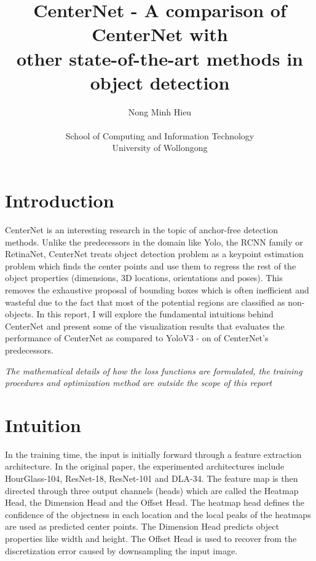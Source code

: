 \documentclass[12pt]{article}
\title{CenterNet - A comparison of CenterNet with \\
other state-of-the-art methods in object detection}
\author{Nong Minh Hieu\\ \\
 School of Computing and Information Technology\\
 University of Wollongong}
\begin{document}
\maketitle

\section*{Introduction}

CenterNet is an interesting research in the topic of anchor-free detection methods. Unlike the predecessors in the domain like Yolo, the RCNN family or RetinaNet, CenterNet treats object detection problem as a keypoint estimation problem which finds the center points and use them to regress the rest of the object properties (dimensions, 3D locations, orientations and poses). This removes the exhaustive proposal of bounding boxes which is often inefficient and wasteful due to the fact that most of the potential regions are classified as non-objects. In this report, I will explore the fundamental intuitions behind CenterNet and present some of the visualization results that evaluates the performance of CenterNet as compared to YoloV3 - on of CenterNet's predecessors.\newline


\textit{The mathematical details of how the loss functions are formulated, the training procedures and optimization method are outside the scope of this report}


\section*{Intuition}
In the training time, the input is initially forward through a feature extraction architecture. In the original paper, the experimented architectures include HourGlass-104, ResNet-18, ResNet-101 and DLA-34. The feature map is then directed through three output channels (heads) which are called the Heatmap Head, the Dimension Head and the Offset Head. The heatmap head defines the confidence of the objectness in each location and the local peaks of the heatmaps are used as predicted center points. The Dimension Head predicts object properties like width and height. The Offset Head is used to recover from the discretization error caused by downsampling the input image.
\end{document}
